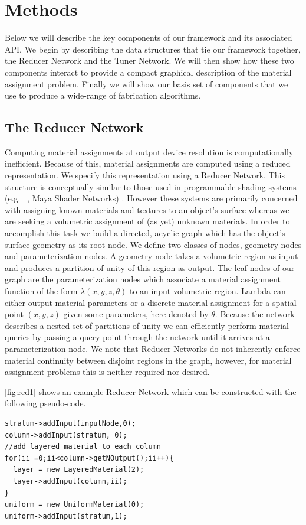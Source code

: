 \documentclass[annual]{acmsiggraph}
\begin{document}
\section{Methods}
Below we will describe the key components of our framework and its associated API. We begin by describing the data structures that tie our framework together, the Reducer Network and the Tuner Network. We will then show how these two components interact to provide a compact graphical description of the material assignment problem. Finally we will show our basis set of components that we use to produce a wide-range of fabrication algorithms. 
\subsection{The Reducer Network}
Computing material assignments at output device resolution is computationally inefficient. Because of this, material assignments are computed  using a reduced representation. We specify this representation using a Reducer Network.  This structure is conceptually similar to those used in programmable shading systems (e.g. ~\cite{Cook1984}, Maya Shader Networks) . However these systems are primarily concerned with assigning known materials and textures to an object's surface whereas we are seeking a volumetric assignment of (as yet) unknown materials. In order to accomplish this task we build a directed, acyclic graph which has the object's surface geometry as its root node. We define two classes of nodes, geometry nodes and parameterization nodes. A geometry node takes a volumetric region as input and produces a partition of unity of this region as output. The leaf nodes of our graph are the parameterization nodes which associate a material assignment function of the form $\lambda\left(x,y,z,\theta\right)$ to an input volumetric region. Lambda can either output material parameters or a discrete material assignment for a spatial point $\left(x,y,z\right)$ given some parameters, here denoted by $\theta$. Because the network describes a nested set of partitions of unity we can efficiently perform material queries by passing a query point through the network until it arrives at a parameterization node. We note that Reducer Networks do not inherently enforce material continuity between disjoint regions in the graph, however, for material assignment problems this is neither required nor desired. 

\autoref{fig:red1} shows an example Reducer Network which can be constructed with the following pseudo-code.
\begin{verbatim}
stratum->addInput(inputNode,0);
column->addInput(stratum, 0);
//add layered material to each column
for(ii =0;ii<column->getNOutput();ii++){
  layer = new LayeredMaterial(2);
  layer->addInput(column,ii);
}
uniform = new UniformMaterial(0);
uniform->addInput(stratum,1);
\end{verbatim}
\end{document}
